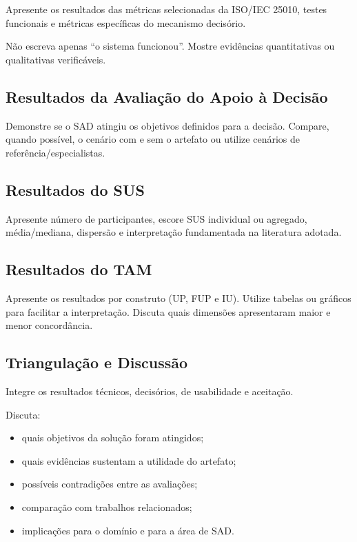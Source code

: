 \documentclass[12pt]{article}
\begin{document}
Apresente os resultados das métricas selecionadas da ISO/IEC 25010, testes funcionais e métricas específicas do mecanismo decisório.

Não escreva apenas ``o sistema funcionou''. Mostre evidências quantitativas ou qualitativas verificáveis.

\subsection{Resultados da Avaliação do Apoio à Decisão}

Demonstre se o SAD atingiu os objetivos definidos para a decisão. Compare, quando possível, o cenário com e sem o artefato ou utilize cenários de referência/especialistas.

\subsection{Resultados do SUS}

Apresente número de participantes, escore SUS individual ou agregado, média/mediana, dispersão e interpretação fundamentada na literatura adotada.

\subsection{Resultados do TAM}

Apresente os resultados por construto (UP, FUP e IU). Utilize tabelas ou gráficos para facilitar a interpretação. Discuta quais dimensões apresentaram maior e menor concordância.

\subsection{Triangulação e Discussão}

Integre os resultados técnicos, decisórios, de usabilidade e aceitação.

Discuta:
\begin{itemize}[noitemsep]
    \item quais objetivos da solução foram atingidos;
    \item quais evidências sustentam a utilidade do artefato;
    \item possíveis contradições entre as avaliações;
    \item comparação com trabalhos relacionados;
    \item implicações para o domínio e para a área de SAD.
\end{itemize}
\end{document}
